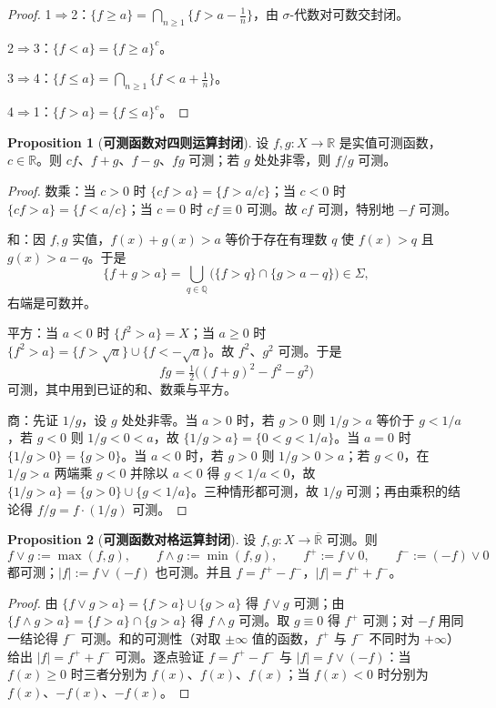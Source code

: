 \documentclass[oneside]{book}
\theoremstyle{definition}
\newcommand{\R}{\mathbb{R}}
\providecommand{\Q}{\mathbb{Q}}
\theoremstyle{definition}
\newtheorem{proposition}{Proposition}[section]
\begin{document}
	\begin{proof}
		1$\Rightarrow$2：$\{f\geqslant a\}=\bigcap_{n\geqslant1}\{f>a-\tfrac1n\}$，由 $\sigma$-代数对可数交封闭。
		
		2$\Rightarrow$3：$\{f<a\}=\{f\geqslant a\}^{c}$。
		
		3$\Rightarrow$4：$\{f\leqslant a\}=\bigcap_{n\geqslant1}\{f<a+\tfrac1n\}$。
		
		4$\Rightarrow$1：$\{f>a\}=\{f\leqslant a\}^{c}$。
	\end{proof}
	
	\begin{proposition}[\bfseries{可测函数对四则运算封闭}]
		设 $f,g:X\to\R$ 是实值可测函数，$c\in\R$。则 $cf$、$f+g$、$f-g$、$fg$ 可测；若 $g$ 处处非零，则 $f/g$ 可测。
	\end{proposition}
	
	\begin{proof}
		数乘：当 $c>0$ 时 $\{cf>a\}=\{f>a/c\}$；当 $c<0$ 时 $\{cf>a\}=\{f<a/c\}$；当 $c=0$ 时 $cf\equiv0$ 可测。故 $cf$ 可测，特别地 $-f$ 可测。
		
		和：因 $f,g$ 实值，$f(x)+g(x)>a$ 等价于存在有理数 $q$ 使 $f(x)>q$ 且 $g(x)>a-q$。于是
		\[
		\{f+g>a\}=\bigcup_{q\in\Q}\bigl(\{f>q\}\cap\{g>a-q\}\bigr)\in\Sigma ,
		\]
		右端是可数并。
		
		平方：当 $a<0$ 时 $\{f^{2}>a\}=X$；当 $a\geqslant0$ 时 $\{f^{2}>a\}=\{f>\sqrt{a}\}\cup\{f<-\sqrt{a}\}$。故 $f^{2}$、$g^{2}$ 可测。于是
		\[
		fg=\tfrac12\bigl((f+g)^{2}-f^{2}-g^{2}\bigr)
		\]
		可测，其中用到已证的和、数乘与平方。
		
		商：先证 $1/g$，设 $g$ 处处非零。当 $a>0$ 时，若 $g>0$ 则 $1/g>a$ 等价于 $g<1/a$，若 $g<0$ 则 $1/g<0<a$，故 $\{1/g>a\}=\{0<g<1/a\}$。当 $a=0$ 时 $\{1/g>0\}=\{g>0\}$。当 $a<0$ 时，若 $g>0$ 则 $1/g>0>a$；若 $g<0$，在 $1/g>a$ 两端乘 $g<0$ 并除以 $a<0$ 得 $g<1/a<0$，故 $\{1/g>a\}=\{g>0\}\cup\{g<1/a\}$。三种情形都可测，故 $1/g$ 可测；再由乘积的结论得 $f/g=f\cdot(1/g)$ 可测。
	\end{proof}
	
	\begin{proposition}[\bfseries{可测函数对格运算封闭}]
		设 $f,g:X\to\overline{\R}$ 可测。则
		\[
		f\vee g:=\max(f,g),\qquad f\wedge g:=\min(f,g),\qquad f^{+}:=f\vee0,\qquad f^{-}:=(-f)\vee0
		\]
		都可测；$|f|:=f\vee(-f)$ 也可测。并且 $f=f^{+}-f^{-}$，$|f|=f^{+}+f^{-}$。
	\end{proposition}
	
	\begin{proof}
		由 $\{f\vee g>a\}=\{f>a\}\cup\{g>a\}$ 得 $f\vee g$ 可测；由 $\{f\wedge g>a\}=\{f>a\}\cap\{g>a\}$ 得 $f\wedge g$ 可测。取 $g\equiv0$ 得 $f^{+}$ 可测；对 $-f$ 用同一结论得 $f^{-}$ 可测。和的可测性（对取 $\pm\infty$ 值的函数，$f^{+}$ 与 $f^{-}$ 不同时为 $+\infty$）给出 $|f|=f^{+}+f^{-}$ 可测。逐点验证 $f=f^{+}-f^{-}$ 与 $|f|=f\vee(-f)$：当 $f(x)\geqslant0$ 时三者分别为 $f(x)$、$f(x)$、$f(x)$；当 $f(x)<0$ 时分别为 $f(x)$、$-f(x)$、$-f(x)$。
	\end{proof}
	
\end{document}
